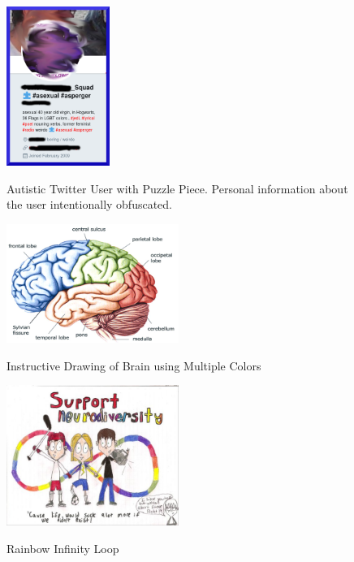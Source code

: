\begin{figure}[ht]
\caption[Twitter User with Puzzle Piece Emoji]{Autistic Twitter User with Puzzle Piece. Personal information about the user intentionally obfuscated.}
\centering
\includegraphics[width=0.3\textwidth]{covfefe.png}
\label{fig:covfefe}
\end{figure}

\begin{figure}[ht]
\caption{Instructive Drawing of Brain using Multiple Colors}
\centering
\includegraphics[width=0.5\textwidth]{brainparts.png}
\label{fig:brainparts}
\end{figure}

\begin{figure}[ht]
\caption{Rainbow Infinity Loop}
\centering
\includegraphics[width=0.5\textwidth]{infinity.jpg}
\label{fig:infinity}
\end{figure}

